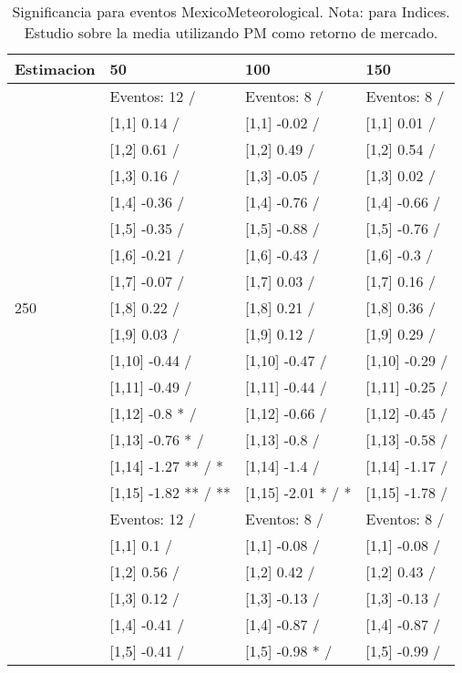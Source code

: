 \begin{table}

\caption{Significancia para eventos MexicoMeteorological. Nota: para Indices. Estudio sobre la media utilizando PM como retorno de mercado.}
\centering
\begin{tabular}[t]{llll}
\toprule
Estimacion & 50 & 100 & 150\\
\midrule
 & Eventos:  12 / & Eventos:  8 / & Eventos:  8 /\\
 & {}[1,1] 0.14  / & {}[1,1] -0.02  / & {}[1,1] 0.01  /\\
 & {}[1,2] 0.61  / & {}[1,2] 0.49  / & {}[1,2] 0.54  /\\
 & {}[1,3] 0.16  / & {}[1,3] -0.05  / & {}[1,3] 0.02  /\\
 & {}[1,4] -0.36  / & {}[1,4] -0.76  / & {}[1,4] -0.66  /\\
\addlinespace
 & {}[1,5] -0.35  / & {}[1,5] -0.88  / & {}[1,5] -0.76  /\\
 & {}[1,6] -0.21  / & {}[1,6] -0.43  / & {}[1,6] -0.3  /\\
 & {}[1,7] -0.07  / & {}[1,7] 0.03  / & {}[1,7] 0.16  /\\
250 & {}[1,8] 0.22  / & {}[1,8] 0.21  / & {}[1,8] 0.36  /\\
 & {}[1,9] 0.03  / & {}[1,9] 0.12  / & {}[1,9] 0.29  /\\
\addlinespace
 & {}[1,10] -0.44  / & {}[1,10] -0.47  / & {}[1,10] -0.29  /\\
 & {}[1,11] -0.49  / & {}[1,11] -0.44  / & {}[1,11] -0.25  /\\
 & {}[1,12] -0.8 * / & {}[1,12] -0.66  / & {}[1,12] -0.45  /\\
 & {}[1,13] -0.76 * / & {}[1,13] -0.8  / & {}[1,13] -0.58  /\\
 & {}[1,14] -1.27 ** / * & {}[1,14] -1.4  / & {}[1,14] -1.17  /\\
\addlinespace
 & {}[1,15] -1.82 ** / ** & {}[1,15] -2.01 * / * & {}[1,15] -1.78  /\\
 & Eventos:  12 / & Eventos:  8 / & Eventos:  8 /\\
 & {}[1,1] 0.1  / & {}[1,1] -0.08  / & {}[1,1] -0.08  /\\
 & {}[1,2] 0.56  / & {}[1,2] 0.42  / & {}[1,2] 0.43  /\\
 & {}[1,3] 0.12  / & {}[1,3] -0.13  / & {}[1,3] -0.13  /\\
\addlinespace
 & {}[1,4] -0.41  / & {}[1,4] -0.87  / & {}[1,4] -0.87  /\\
 & {}[1,5] -0.41  / & {}[1,5] -0.98 * / & {}[1,5] -0.99  /\\

\end{tabular}
\end{table}
